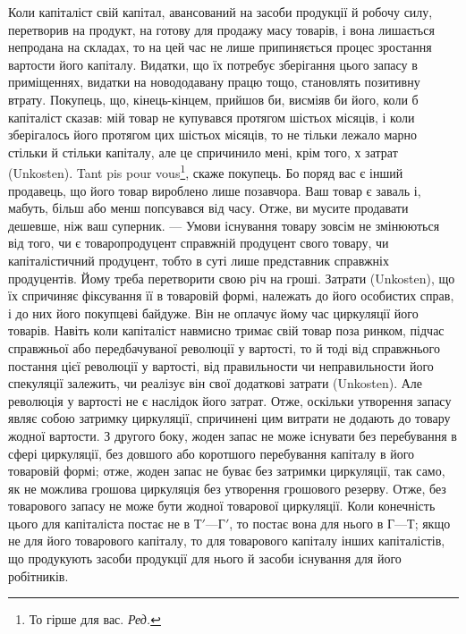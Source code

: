 Коли капіталіст свій капітал, авансований на засоби продукції й робочу
силу, перетворив на продукт, на готову для продажу масу товарів, і вона
лишається непродана на складах, то на цей час не лише припиняється
процес зростання вартости його капіталу. Видатки, що їх потребує зберігання
цього запасу в приміщеннях, видатки на новододавану працю тощо, становлять
позитивну втрату. Покупець, що, кінець-кінцем, прийшов би, висміяв
би його, коли б капіталіст сказав: мій товар не купувався протягом шістьох
місяців, і коли зберігалось його протягом цих шістьох місяців, то не
тільки лежало марно стільки й стільки капіталу, але це спричинило мені,
крім того, $х$ затрат (Unkosten). Tant pis pour vous\footnote*{
То гірше для вас. \emph{Ред.}
}, скаже покупець. Бо
поряд вас є інший продавець, що його товар вироблено лише позавчора.
Ваш товар є заваль і, мабуть, більш або менш попсувався від часу. Отже,
ви мусите продавати дешевше, ніж ваш суперник. — Умови існування
товару зовсім не змінюються від того, чи є товаропродуцент справжній
продуцент свого товару, чи капіталістичний продуцент, тобто в суті
лише представник справжніх продуцентів. Йому треба перетворити свою
річ на гроші. Затрати (Unkosten), що їх спричиняє фіксування її
в товаровій формі, належать до його особистих справ, і до них його
покупцеві байдуже. Він не оплачує йому час циркуляції його товарів.
Навіть коли капіталіст навмисно тримає свій товар поза ринком, підчас
справжньої або передбачуваної революції у вартості, то й тоді від
справжнього постання цієї революції у вартості, від правильности чи
неправильности його спекуляції залежить, чи реалізує він свої додаткові
затрати (Unkosten). Але революція у вартості не є наслідок його затрат.
Отже, оскільки утворення запасу являє собою затримку циркуляції, спричинені
цим витрати не додають до товару жодної вартости. З другого
боку, жоден запас не може існувати без перебування в сфері циркуляції,
без довшого або коротшого перебування капіталу в його товаровій
формі; отже, жоден запас не буває без затримки циркуляції, так само,
як не можлива грошова циркуляція без утворення грошового резерву.
Отже, без товарового запасу не може бути жодної товарової циркуляції.
Коли конечність цього для капіталіста постає не в $Т' — Г'$, то постає
вона для нього в $Г — Т$; якщо не для його товарового капіталу, то
для товарового капіталу інших капіталістів, що продукують засоби продукції
для нього й засоби існування для його робітників.

